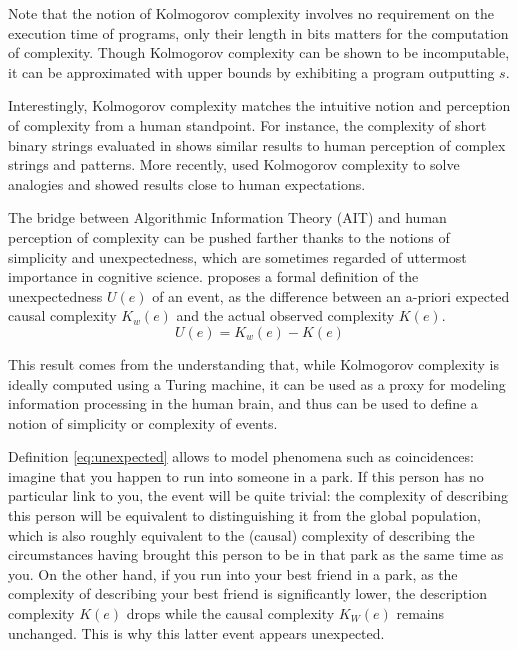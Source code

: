 \documentclass[entropy,article,submit,moreauthors,pdftex]{Definitions/mdpi}
\begin{document}
Note that the notion of Kolmogorov complexity involves no requirement on the execution time of
programs, only their length in bits matters for the computation of
complexity. Though Kolmogorov complexity can be shown to be
incomputable\cite{li_introduction_2008},
it can be approximated with
upper bounds by exhibiting a program outputting $s$.

Interestingly, Kolmogorov complexity matches the intuitive
notion and perception of complexity from a human standpoint. For instance, the
complexity of short binary strings evaluated in \cite{delahaye_numerical_2012}
shows similar results to human perception of complex strings and patterns. More
recently, \cite{murena_solving_2020} used Kolmogorov complexity to solve
analogies and showed results close to human expectations.

The bridge between Algorithmic Information Theory (AIT) and human perception of
complexity can be pushed farther thanks to the notions of simplicity and unexpectedness,
which are sometimes regarded of uttermost importance in cognitive science\cite
{chater_simplicity_2003}.
\cite{dessalles2011coincidences} proposes a formal definition of the
unexpectedness $U(e)$ of an event, as the difference between an a-priori
expected causal complexity $K_{w}(e)$ and the actual observed complexity $K
    (e)$.
\begin{equation}
    \label{eq:unexpected} U(e) = K_{w}(e) - K(e)
\end{equation}

This result comes from the understanding that, while Kolmogorov complexity is
ideally computed using a Turing machine, it can be used as a proxy for modeling
information processing in the human brain, and thus can be used to define a notion of
simplicity or complexity of events.

Definition \ref{eq:unexpected} allows to model phenomena
such as coincidences: imagine that you happen to run into someone in a park.
If this person has no particular link to you, the event will be quite
trivial: the complexity of describing this person will be equivalent to
distinguishing it from the global population, which is also roughly
equivalent to the (causal) complexity of describing the circumstances having brought this person to be in
that park as the same time as you. On the other hand, if you run into your best friend in
a park, as the complexity of describing your best friend is significantly
lower, the description complexity $K(e)$ drops while the causal complexity
$K_W (e)$ remains unchanged. This is why this latter  event appears unexpected.
\end{document}
